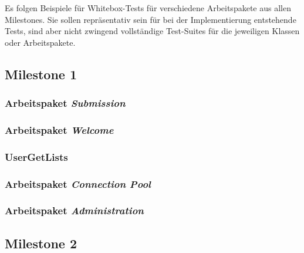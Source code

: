 \lstset{
    language=Java,
    basicstyle=\ttfamily\selectfont\scriptsize,
}

\newcommand{\testlisting}[1]{}

Es folgen Beispiele für Whitebox-Tests für verschiedene Arbeitspakete aus allen Milestones.
Sie sollen repräsentativ sein für bei der Implementierung entstehende Tests, sind aber nicht zwingend vollständige
Test-Suites für die jeweiligen Klassen oder Arbeitspakete.

\subsection{Milestone 1}\label{subsec:milestone1}

\subsubsection{Arbeitspaket \emph{Submission}}
\testlisting{SubmissionBackingTest}
\testlisting{SubmissionServiceTest}
\testlisting{SubmissionRepositoryTest}

\subsubsection{Arbeitspaket \emph{Welcome}}
\testlisting{LoginServiceTest}

\subsubsection{UserGetLists}
\testlisting{UserRepositoryGetListTest}

\subsubsection{Arbeitspaket \emph{Connection Pool}}
\testlisting{TransactionTest}
\testlisting{ConnectionPoolTest}

\subsubsection{Arbeitspaket \emph{Administration}}
\testlisting{SystemSettingsRepositoryTest.java}

\subsection{Milestone 2}\label{subsec:milestone2}

